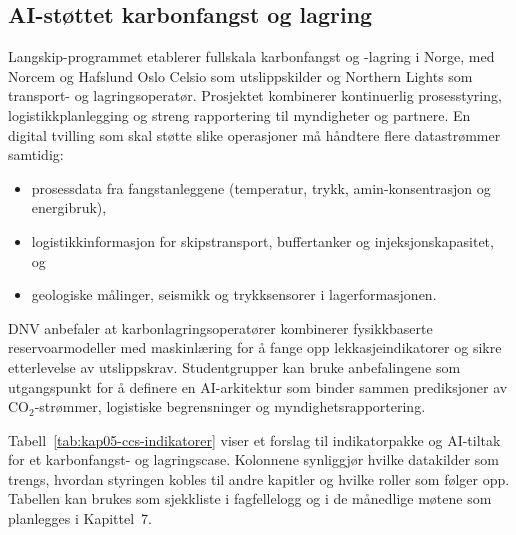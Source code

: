 \subsection{AI-støttet karbonfangst og lagring}
Langskip-programmet etablerer fullskala karbonfangst og -lagring i Norge, med Norcem og Hafslund Oslo Celsio som utslippskilder og Northern Lights som transport- og lagringsoperatør.\citep{oed2023langskip,northernlights2024readiness} Prosjektet kombinerer kontinuerlig prosesstyring, logistikkplanlegging og streng rapportering til myndigheter og partnere. En digital tvilling som skal støtte slike operasjoner må håndtere flere datastrømmer samtidig:
\begin{itemize}
    \item prosessdata fra fangstanleggene (temperatur, trykk, amin-konsentrasjon og energibruk),
    \item logistikkinformasjon for skipstransport, buffertanker og injeksjonskapasitet, og
    \item geologiske målinger, seismikk og trykksensorer i lagerformasjonen.
\end{itemize}
DNV anbefaler at karbonlagringsoperatører kombinerer fysikkbaserte reservoarmodeller med maskinlæring for å fange opp lekkasjeindikatorer og sikre etterlevelse av utslippskrav.\citep{dnv2023ccsmonitoring} Studentgrupper kan bruke anbefalingene som utgangspunkt for å definere en AI-arkitektur som binder sammen prediksjoner av CO$_2$-strømmer, logistiske begrensninger og myndighetsrapportering.

Tabell~\ref{tab:kap05-ccs-indikatorer} viser et forslag til indikatorpakke og AI-tiltak for et karbonfangst- og lagringscase. Kolonnene synliggjør hvilke datakilder som trengs, hvordan styringen kobles til andre kapitler og hvilke roller som følger opp. Tabellen kan brukes som sjekkliste i fagfellelogg og i de månedlige møtene som planlegges i Kapittel~7.

